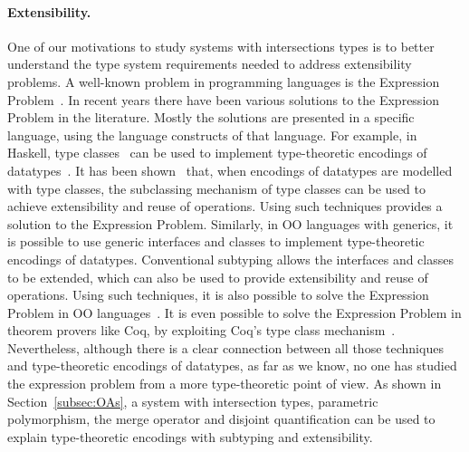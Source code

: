 \paragraph{Extensibility.} One of our motivations to study systems
with intersections types is to better understand the
type system requirements needed to address extensibility problems.
A well-known problem in programming languages is the Expression
Problem~\cite{wadler1998expression}. In recent years there have been
various solutions to the Expression Problem in the literature. Mostly
the solutions are presented in a specific language, using the language
constructs of that language. For example, in Haskell, type classes~\cite{WadlerB89}
can be used to implement type-theoretic encodings of
datatypes~\cite{Hinze:2006}. It has been shown~\cite{finally-tagless}
that, when encodings of datatypes are modelled with type classes,
the subclassing mechanism of type classes can be used to achieve
extensibility and reuse of operations. Using such techniques provides
a solution to the Expression Problem. Similarly, in OO languages with
generics, it is possible to use generic interfaces and classes to
implement type-theoretic encodings of datatypes. Conventional
subtyping allows the interfaces and classes to be extended, which can
also be used to provide extensibility and reuse of operations. Using
such techniques, it is also possible to solve the Expression Problem
in OO languages~\cite{oliveira09modular,oliveira2012extensibility}.
It is even possible to solve the Expression Problem in theorem provers
like Coq, by exploiting Coq's type class mechanism~\cite{DelawareOS13}.
Nevertheless, although there is a clear connection between all those
techniques and type-theoretic encodings of datatypes, as far as we
know, no one has studied the expression problem from a more
type-theoretic point of view. As shown in Section~\ref{subsec:OAs}, a system
with intersection types, parametric polymorphism, the merge operator
and disjoint quantification can be used to explain type-theoretic
encodings with subtyping and extensibility.

